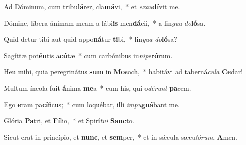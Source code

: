 \item Ad Dóminum, cum tribu\textbf{lá}rer, cla\textbf{má}vi,~* et \textit{ex}\textit{au}\textbf{dí}vit me.

\item Dómine, líbera ánimam meam a lábi\textbf{is} men\textbf{dá}cii,~* a lin\textit{gua} \textit{do}\textbf{ló}sa.

\item Quid detur tibi aut quid appo\textbf{ná}tur \textbf{ti}bi,~* lin\textit{gua} \textit{do}\textbf{ló}sa?

\item Sagíttæ pot\textbf{én}tis a\textbf{cú}tæ~* cum carbónibus iu\textit{ni}\textit{pe}\textbf{ró}rum.

\item Heu mihi, quia peregrinátus \textbf{sum} in \textbf{Mo}soch,~* habitávi ad taberná\textit{cu}\textit{la} \textbf{Ce}dar!

\item Multum íncola fuit \textbf{á}nima \textbf{me}a~* cum his, qui o\textit{dé}\textit{runt} \textbf{pa}cem.

\item Ego \textbf{e}ram pa\textbf{cí}ficus;~* cum loquébar, illi \textit{im}\textit{pu}\textbf{gná}bant me.

\item Glória \textbf{Pa}tri, et \textbf{Fí}lio,~* et Spirí\textit{tu}\textit{i} \textbf{Sanc}to.

\item Sicut erat in princípio, et \textbf{nunc}, et \textbf{sem}per,~* et in sǽcula sæcu\textit{ló}\textit{rum}. \textbf{A}men.